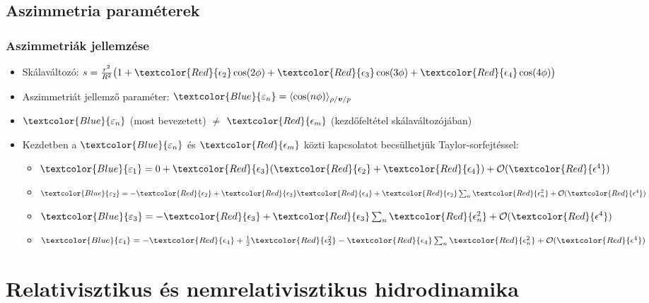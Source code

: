 \documentclass{beamer}
\begin{document}
\subsection{Aszimmetria paraméterek}
\begin{frame}[noframenumbering]
\frametitle{Aszimmetriák jellemzése}
\begin{itemize}
  \setlength{\itemsep}{12pt}
\item<1-> Skálaváltozó: $s=\frac{r^2}{R^2}\big(1+\textcolor{Red}{\epsilon_2}\cos(2\phi)+\textcolor{Red}{\epsilon_3}\cos(3\phi)+\textcolor{Red}{\epsilon_4}\cos(4\phi)\big)$
\item<1-> Aszimmetriát jellemző paraméter: $\textcolor{Blue}{\varepsilon_n}=\langle \cos(n\phi)\rangle_{\rho/\bm{v}/p}$
\item<1-> $\textcolor{Blue}{\varepsilon_n}$ (most bevezetett)  $\neq$ $\textcolor{Red}{\epsilon_m}$  (kezdőfeltétel skálaváltozójában)
\item<1-> Kezdetben a $\textcolor{Blue}{\varepsilon_n}$ és $\textcolor{Red}{\epsilon_m}$ közti kapcsolatot becsülhetjük Taylor-sorfejtéssel:
\vspace{10pt}
\begin{itemize}
 \setlength{\itemsep}{8pt}
\item<1-> $\textcolor{Blue}{\varepsilon_1}=0+\textcolor{Red}{\epsilon_3}(\textcolor{Red}{\epsilon_2}+\textcolor{Red}{\epsilon_4})+\mathcal{O}(\textcolor{Red}{\epsilon^4})$
\item<1-> $\textcolor{Blue}{\varepsilon_2}=-\textcolor{Red}{\epsilon_2}+\textcolor{Red}{\epsilon_2}\textcolor{Red}{\epsilon_4}+\textcolor{Red}{\epsilon_2}\sum_{n} \textcolor{Red}{\epsilon_n^2}+\mathcal{O}(\textcolor{Red}{\epsilon^4})$
\item<1-> $\textcolor{Blue}{\varepsilon_3}=-\textcolor{Red}{\epsilon_3}+\textcolor{Red}{\epsilon_3}\sum_n \textcolor{Red}{\epsilon_n^2}+\mathcal{O}(\textcolor{Red}{\epsilon^4})$
\item<1-> $\textcolor{Blue}{\varepsilon_4}=-\textcolor{Red}{\epsilon_4}+\frac{1}{2}\textcolor{Red}{\epsilon_2^2}-\textcolor{Red}{\epsilon_4}\sum_n\textcolor{Red}{\epsilon_n^2}+\mathcal{O}(\textcolor{Red}{\epsilon^4})$
\end{itemize}
\end{itemize}

\end{frame}


\section{Relativisztikus és nemrelativisztikus hidrodinamika}
\end{document}
